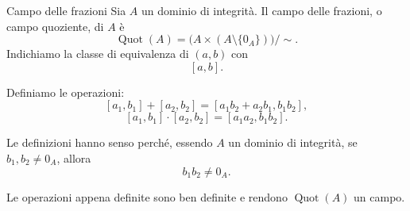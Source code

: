 \documentclass[a4paper]{article}
\begin{document}
\begin{radioactive}
\begin{snippetdefinition}{Campo delle frazioni}
    Sia \(A\) un dominio di integrità.
    Il campo delle frazioni, o campo quoziente, di \(A\) è
    \[
        \operatorname{Quot}(A)
        =
        \big(A\times(A\setminus\{0_A\})\big)/\sim.
    \]
    Indichiamo la classe di equivalenza di \((a,b)\) con
    \[
        [a,b].
    \]

    Definiamo le operazioni:
    \[
        [a_1,b_1]+[a_2,b_2]
        =
        [a_1b_2+a_2b_1,b_1b_2],
    \]
    \[
        [a_1,b_1]\cdot [a_2,b_2]
        =
        [a_1a_2,b_1b_2].
    \]
\end{snippetdefinition}
\end{radioactive}

\begin{radioactive}
Le definizioni hanno senso perché, essendo \(A\) un dominio di integrità, se \(b_1,b_2\neq 0_A\), allora
\[
    b_1b_2\neq 0_A.
\]
\end{radioactive}

\begin{radioactive}
\begin{snippetproposition}{}
    Le operazioni appena definite sono ben definite e rendono \(\operatorname{Quot}(A)\) un campo.
\end{snippetproposition}
\end{radioactive}
\end{document}
